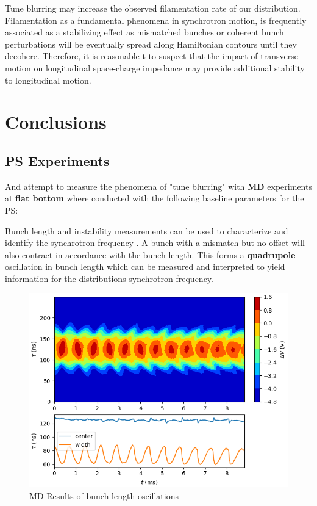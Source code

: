 Tune blurring may increase the observed filamentation rate of our distribution. Filamentation as a fundamental phenomena in synchrotron motion, is frequently associated as a stabilizing effect as mismatched bunches or coherent bunch perturbations will be eventually spread along Hamiltonian contours until they decohere. Therefore, it is reasonable t to suspect that the impact of transverse motion on longitudinal space-charge impedance may provide additional stability to longitudinal motion.

\chapter{Conclusions}

\section{PS Experiments}

And attempt to measure the phenomena of "tune blurring" with \textbf{MD} experiments at \textbf{flat bottom} where conducted with the following baseline parameters for the PS:



Bunch length and instability measurements can be used to characterize and identify the synchrotron frequency \cite{sacherer_bunch_1977}. A bunch with a mismatch but no offset will also contract in accordance with the bunch length. This forms a \textbf{quadrupole} oscillation in bunch length which can be measured and interpreted to yield information for the distributions synchrotron frequency.

\begin{figure}
    \centering
    \includegraphics{figs/injosc.14x144.dat.npy.png}
    \caption{MD Results of bunch length oscillations}
\end{figure}

